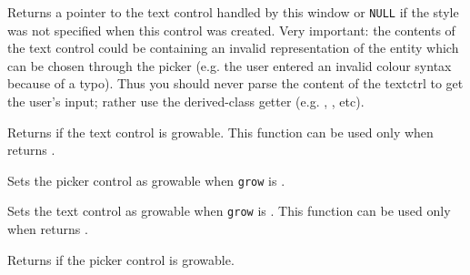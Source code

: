 
Returns a pointer to the text control handled by this window or \texttt{NULL} if the  style was not specified when this control was created.
Very important: the contents of the text control could be containing an invalid representation of the entity which can be chosen through the picker (e.g. the user entered an invalid colour syntax because of a typo). Thus you should never parse the content of the textctrl to get the user's input; rather use the derived-class getter (e.g. , , etc).


\label{wxpickerbaseistextctrlgrowable}


Returns \true if the text control is growable.
This function can be used only when  returns \true.


\label{wxpickerbasesetpickerctrlgrowable}


Sets the picker control as growable when {\tt grow} is \true.


\label{wxpickerbasesettextctrlgrowable}


Sets the text control as growable when {\tt grow} is \true.
This function can be used only when  returns \true.



\label{wxpickerbaseispickerctrlgrowable}


Returns \true if the picker control is growable.

